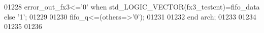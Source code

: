 \begin{DoxyCode}
01228 \textcolor{vhdlchar}{error_out_fx3}\textcolor{vhdlchar}{<=}\textcolor{vhdlchar}{'}\textcolor{vhdllogic}{}\textcolor{vhdllogic}{0}\textcolor{vhdlchar}{'} \textcolor{keywordflow}{when}  \textcolor{comment}{std\_LOGIC\_VECTOR}\textcolor{vhdlchar}{(}\textcolor{vhdlchar}{fx3_testcnt}\textcolor{vhdlchar}{)}\textcolor{vhdlchar}{=}\textcolor{vhdlchar}{fifo_data} \textcolor{keywordflow}{else} \textcolor{vhdlchar}{'}\textcolor{vhdllogic}{}\textcolor{vhdllogic}{1}\textcolor{vhdlchar}{'}; 
01229 
01230 \textcolor{vhdlchar}{fifo_q}\textcolor{vhdlchar}{<=}\textcolor{vhdlchar}{(}\textcolor{keywordflow}{others}\textcolor{vhdlchar}{=}\textcolor{vhdlchar}{>}\textcolor{vhdlchar}{'}\textcolor{vhdllogic}{}\textcolor{vhdllogic}{0}\textcolor{vhdlchar}{'}\textcolor{vhdlchar}{)}; 
01231         
01232 \textcolor{keywordflow}{end} \textcolor{vhdlchar}{arch};   
01233 
01234 
01235 
01236 
\end{DoxyCode}
